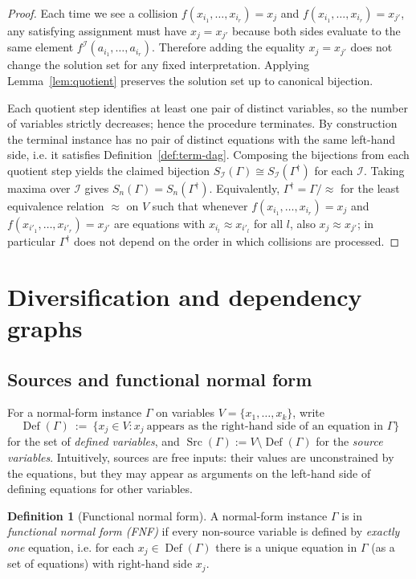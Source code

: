 \documentclass[11pt]{article}
\theoremstyle{plain}
\theoremstyle{definition}
\theoremstyle{definition}
\newtheorem{definition}[theorem]{Definition}
\theoremstyle{remark}
\newcommand{\Sn}{S_n}
\newcommand{\Def}{\operatorname{Def}}
\newcommand{\Src}{\operatorname{Src}}
\begin{document}
\begin{proof}
Each time we see a collision
$f(x_{i_1},\dots,x_{i_r})=x_j$ and $f(x_{i_1},\dots,x_{i_r})=x_{j'}$,
any satisfying assignment must have $x_j=x_{j'}$ because both sides evaluate to the same element
$f^{\mathcal I}(a_{i_1},\dots,a_{i_r})$.
Therefore adding the equality $x_j=x_{j'}$ does not change the solution set for any fixed interpretation.
Applying Lemma~\ref{lem:quotient} preserves the solution set up to canonical bijection.

Each quotient step identifies at least one pair of distinct variables, so the number of variables strictly decreases;
hence the procedure terminates.
By construction the terminal instance has no pair of distinct equations with the same left-hand side, i.e. it satisfies
Definition~\ref{def:term-dag}.
Composing the bijections from each quotient step yields the claimed bijection
$S_{\mathcal I}(\Gamma)\cong S_{\mathcal I}(\Gamma^{\dagger})$ for each $\mathcal I$.
Taking maxima over $\mathcal I$ gives $\Sn(\Gamma)=\Sn(\Gamma^{\dagger})$.
Equivalently, $\Gamma^{\dagger}=\Gamma/\!\approx$ for the least equivalence relation $\approx$
on $V$ such that whenever $f(x_{i_1},\dots,x_{i_r})=x_j$ and $f(x_{i'_1},\dots,x_{i'_r})=x_{j'}$
are equations with $x_{i_l}\approx x_{i'_l}$ for all $l$, also $x_j\approx x_{j'}$; in
particular $\Gamma^{\dagger}$ does not depend on the order in which collisions are processed.
\end{proof}

\section{Diversification and dependency graphs}
\label{sec:div}

\subsection{Sources and functional normal form}
\label{subsec:fnf}

For a normal-form instance $\Gamma$ on variables $V=\{x_1,\dots,x_k\}$, write
\[
\Def(\Gamma)\ :=\ \{x_j\in V : x_j\ \text{appears as the right-hand side of an equation in }\Gamma\}
\]
for the set of \emph{defined variables}, and
\(\Src(\Gamma):=V\setminus \Def(\Gamma)\)
for the \emph{source variables}.
Intuitively, sources are free inputs: their values are unconstrained by the equations, but they may appear
as arguments on the left-hand side of defining equations for other variables.

\begin{definition}[Functional normal form]
\label{def:fnf}
A normal-form instance $\Gamma$ is in \emph{functional normal form (FNF)} if every non-source variable is
defined by \emph{exactly one} equation, i.e.
for each $x_j\in\Def(\Gamma)$ there is a unique equation in $\Gamma$ (as a set of equations) with
right-hand side $x_j$.
\end{definition}
\end{document}
